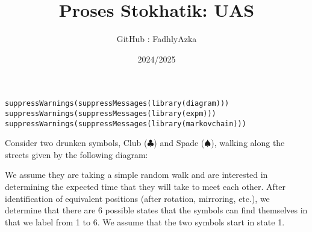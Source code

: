 \documentclass[answers]{exam}
\begin{document}
\title{Proses Stokhatik: UAS}
\author{GitHub : FadhlyAzka}
\date{2024/2025}

\maketitle

\begin{lstlisting}[title=Code]
suppressWarnings(suppressMessages(library(diagram)))
suppressWarnings(suppressMessages(library(expm)))
suppressWarnings(suppressMessages(library(markovchain)))
\end{lstlisting}

\begin{questions}
    \question Consider two drunken symbols, Club ($\clubsuit$) and Spade ($\spadesuit$), walking along the streets given by the following diagram:
    \begin{center}
    \end{center}
    We assume they are taking a simple random walk and are interested in determining the expected time that they will take to meet each other. After identification of equivalent positions (after rotation, mirroring, etc.), we determine that there are 6 possible states that the symbols can find themselves in that we label from 1 to 6. We assume that the two symbols start in state 1.
    
\end{questions}
\end{document}

